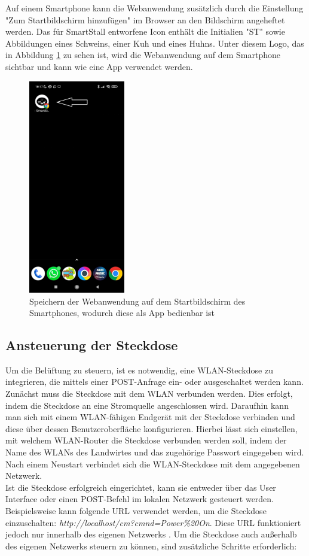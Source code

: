 \documentclass[conference]{IEEEtran}
\begin{document}
\newpage
Auf einem Smartphone kann die Webanwendung zusätzlich durch die Einstellung "Zum Startbildschirm hinzufügen" im Browser an den Bildschirm angeheftet werden. Das für SmartStall entworfene Icon enthält die Initialien "ST" sowie Abbildungen eines Schweins, einer Kuh und eines Huhns. Unter diesem Logo, das in Abbildung \ref{stApp} zu sehen ist, wird die Webanwendung auf dem Smartphone sichtbar und kann wie eine App verwendet werden.
\begin{figure}[h]
	\centering
	\includegraphics[width=42mm]{fig/stApp.jpg}
	\caption{Speichern der Webanwendung auf dem Startbildschirm des Smartphones, wodurch diese als App bedienbar ist}
	\label{stApp}
\end{figure}

\subsection{Ansteuerung der Steckdose}
Um die Belüftung zu steuern, ist es notwendig, eine WLAN-Steckdose zu integrieren, die mittels einer POST-Anfrage ein- oder ausgeschaltet werden kann. Zunächst muss die Steckdose mit dem WLAN verbunden werden. Dies erfolgt, indem die Steckdose an eine Stromquelle angeschlossen wird. Daraufhin kann man sich mit einem WLAN-fähigen Endgerät mit der Steckdose verbinden und diese über dessen Benutzeroberfläche konfigurieren. Hierbei lässt sich einstellen, mit welchem WLAN-Router die Steckdose verbunden werden soll, indem der Name des WLANs des Landwirtes und das zugehörige Passwort eingegeben wird. Nach einem Neustart verbindet sich die WLAN-Steckdose mit dem angegebenen Netzwerk. \\
Ist die Steckdose erfolgreich eingerichtet, kann sie entweder über das User Interface oder einen POST-Befehl im lokalen Netzwerk gesteuert werden. Beispielsweise kann folgende URL verwendet werden, um die Steckdose einzuschalten: \textit{http://localhost/cm?cmnd=Power\%20On}. Diese URL funktioniert jedoch nur innerhalb des eigenen Netzwerks \cite{delock}. Um die Steckdose auch außerhalb des eigenen Netzwerks steuern zu können, sind zusätzliche Schritte erforderlich:
\end{document}
